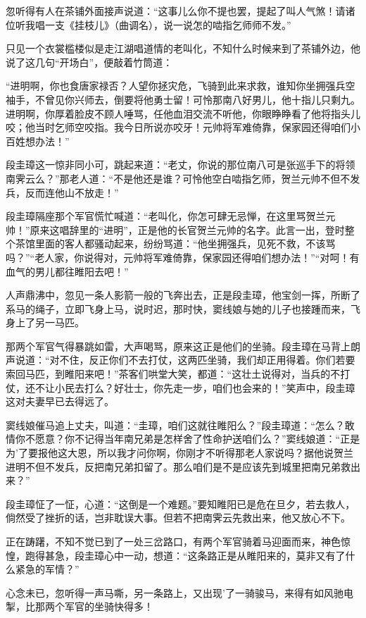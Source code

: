 \documentclass[12pt,oneside]{book}
\begin{document}
忽听得有人在茶铺外面接声说道：``这事儿么你不提也罢，提起了叫人气煞！请诸位听我唱一支《挂枝儿》（曲调名），说一说怎的啮指乞师师不发。''

只见一个衣裳槛楼似是走江湖唱道情的老叫化，不知什么时候来到了茶铺外边，他说了这几句``开场白''，便敲着竹筒道：

``进明啊，你也食唐家禄否？人望你拯灾危，飞骑到此来求救，谁知你坐拥强兵空袖手，不曾见你兴师去，倒要将他勇士留！可怜那南八好男儿，他十指儿只剩九。进明啊，你厚着脸皮不顾人唾骂，任他血泪交流不听他，你眼睁睁看了他将指头儿咬；他当时乞师空咬指。我今日所说亦咬牙！元帅将军难倚靠，保家园还得咱们小百姓想办法！''

段圭璋这一惊非同小可，跳起来道：``老丈，你说的那位南八可是张巡手下的将领南霁云么？''那老人道：``不是他还是谁？可怜他空白啮指乞师，贺兰元帅不但不发兵，反而连他山不放走！''

段圭璋隔座那个军官慌忙喊道：``老叫化，你怎可肆无忌惮，在这里骂贺兰元帅！''原来这唱辞里的``进明''，正是他的长官贺兰元帅的名字。此言一出，登时整个茶馆里面的客人都骚动起来，纷纷骂道：``他坐拥强兵，见死不救，不该骂吗？''``老人家，你说得对，元帅将军难倚靠，保家园还得咱们想办法！''``对呵！有血气的男儿都往睢阳去吧！''

人声鼎沸中，忽见一条人影箭一般的飞奔出去，正是段圭璋，他宝剑一挥，所断了系马的绳子，立即飞身上马，说时迟，那时快，窦线娘与她的儿子也接踵而来，飞身上了另一马匹。

那两个军官气得暴跳如雷，大声喝骂，原来这正是他们的坐骑。段圭璋在马背上朗声说道：``对不住，反正你们不去打仗，这两匹坐骑，我们却正用得着。你们若要索回马匹，到睢阳来吧！''茶客们哄堂大笑，都道：``这壮土说得对，当兵的不打仗，还不让小民去打么？好壮士，你先走一步，咱们也会来的！''笑声中，段圭璋这对夫妻早已去得远了。

窦线娘催马追上丈夫，叫道：``圭璋，咱们这就往睢阳么？''段圭璋道：``怎么？敢情你不愿意？你不记得当年南兄弟是怎样舍了性命护送咱们么？''窦线娘道：``正是为'了要报他这大恩，所以我才问你啊，你刚才不听得那老人家说吗？据他说贺兰进明不但不发兵，反把南兄弟扣留了。那么咱们是不是应该先到城里把南兄弟救出来？''

段圭璋怔了一怔，心道：``这倒是一个难题。''要知睢阳已是危在旦夕，若去救人，倘然受了挫折的话，岂非耽误大事。但若不把南霁云先救出来，他又放心不下。

正在踌躇，不知不觉已到了一处三岔路口，有两个军官骑着马迎面而来，神色惊惶，跑得甚急，段圭璋心中一动，想道：``这条路正是从睢阳来的，莫非又有了什么紧急的军情？''

心念未已，忽听得一声马嘶，另一条路上，又出现'了一骑骏马，来得有如风驰电掣，比那两个军官的坐骑快得多！
\end{document}

